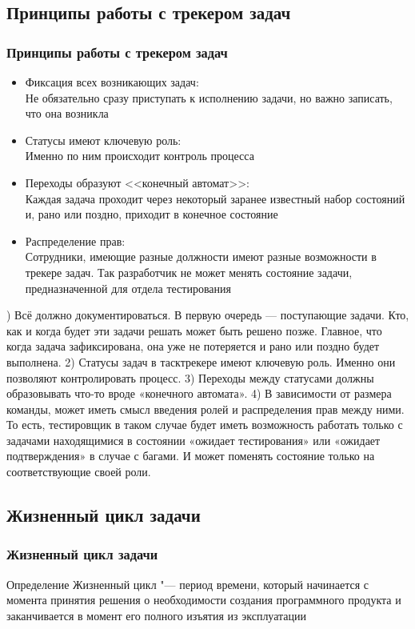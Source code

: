 \documentclass{../industrial-development}
\begin{document}
\subsection{Принципы работы с трекером задач}

\begin{frame} \frametitle{Принципы работы с трекером задач}
	\begin{itemize}
		\item Фиксация всех возникающих задач:\\
		Не обязательно сразу приступать к исполнению задачи, но важно записать, что она возникла
		\item Статусы имеют ключевую роль:\\
		Именно по ним происходит контроль процесса
		\item Переходы образуют <<конечный автомат>>:\\
		Каждая задача проходит через некоторый заранее известный набор состояний и, рано или поздно, приходит в конечное состояние
		\item Распределение прав:\\
		Сотрудники, имеющие разные должности имеют разные возможности в трекере задач. Так разработчик не может менять состояние задачи, предназначенной для отдела тестирования
	\end{itemize}
\end{frame}

) Всё должно документироваться. В первую очередь — поступающие задачи. Кто, как и когда будет эти задачи решать может быть решено позже. Главное, что когда задача зафиксирована, она уже не потеряется и рано или поздно будет выполнена.
2) Статусы задач в тасктрекере имеют ключевую роль. Именно они позволяют контролировать процесс.
3) Переходы между статусами должны образовывать что-то вроде «конечного автомата».
4) В зависимости от размера команды, может иметь смысл введения ролей и распределения прав между ними. То есть, тестировщик в таком случае будет иметь возможность работать только с задачами находящимися в состоянии «ожидает тестирования» или «ожидает подтверждения» в случае с багами. И может поменять состояние только на соответствующие своей роли.

\subsection{Жизненный цикл задачи}

\begin{frame} \frametitle{Жизненный цикл задачи}
\begin{block}{Определение}
    Жизненный цикл "--- период времени, который начинается с момента принятия решения о необходимости создания программного продукта и заканчивается в момент его полного изъятия из эксплуатации
  \end{block}
\end{frame}
\end{document}
